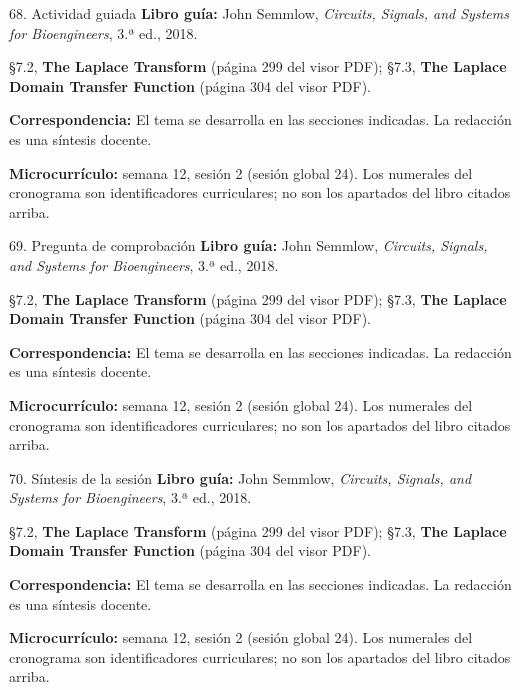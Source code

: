 \documentclass[
  10pt,
  ignorenonframetext,
  aspectratio=169,
  spanish,
]{beamer}
\begin{document}
\begin{frame}{68. Actividad guiada}
\label{actividad-guiada-3}
\textbf{Libro guía:} John Semmlow, \emph{Circuits, Signals, and Systems
for Bioengineers}, 3.ª ed., 2018.

§7.2, \textbf{The Laplace Transform} (página 299 del visor PDF); §7.3,
\textbf{The Laplace Domain Transfer Function} (página 304 del visor
PDF).

\textbf{Correspondencia:} El tema se desarrolla en las secciones
indicadas. La redacción es una síntesis docente.

\textbf{Microcurrículo:} semana 12, sesión 2 (sesión global 24). Los
numerales del cronograma son identificadores curriculares; no son los
apartados del libro citados arriba.
\end{frame}

\begin{frame}{69. Pregunta de comprobación}
\label{pregunta-de-comprobaciuxf3n-3}
\textbf{Libro guía:} John Semmlow, \emph{Circuits, Signals, and Systems
for Bioengineers}, 3.ª ed., 2018.

§7.2, \textbf{The Laplace Transform} (página 299 del visor PDF); §7.3,
\textbf{The Laplace Domain Transfer Function} (página 304 del visor
PDF).

\textbf{Correspondencia:} El tema se desarrolla en las secciones
indicadas. La redacción es una síntesis docente.

\textbf{Microcurrículo:} semana 12, sesión 2 (sesión global 24). Los
numerales del cronograma son identificadores curriculares; no son los
apartados del libro citados arriba.
\end{frame}

\begin{frame}{70. Síntesis de la sesión}
\label{suxedntesis-de-la-sesiuxf3n-3}
\textbf{Libro guía:} John Semmlow, \emph{Circuits, Signals, and Systems
for Bioengineers}, 3.ª ed., 2018.

§7.2, \textbf{The Laplace Transform} (página 299 del visor PDF); §7.3,
\textbf{The Laplace Domain Transfer Function} (página 304 del visor
PDF).

\textbf{Correspondencia:} El tema se desarrolla en las secciones
indicadas. La redacción es una síntesis docente.

\textbf{Microcurrículo:} semana 12, sesión 2 (sesión global 24). Los
numerales del cronograma son identificadores curriculares; no son los
apartados del libro citados arriba.
\end{frame}
\end{document}
